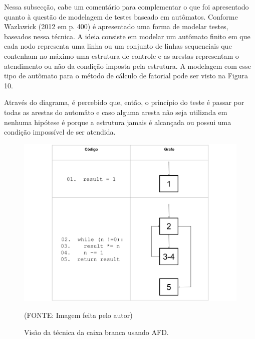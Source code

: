 \documentclass[
    12pt,       %
    openright,      %
    twoside,      %
    a4paper,      %
    english,      %
    french,       %
    spanish,      %
    brazil,       %
    ]{abntex2}
\begin{document}
              Nessa subsecção, cabe um comentário para complementar o que foi apresentado quanto à
              questão de modelagem de testes baseado em autômatos. Conforme Wazlawick (2012 em p. 400) é
              apresentado uma forma de modelar testes, baseados nessa técnica. A ideia consiste em
              modelar um autômato finito em que cada nodo representa uma linha ou um conjunto de
              linhas sequenciais que contenham no máximo uma estrutura de controle e as arestas
              representam o atendimento ou não da condição imposta pela estrutura. A modelagem
              com esse tipo de autômato para o método de cálculo de fatorial pode ser visto na Figura 10.

              Através do diagrama, é percebido que, então, o princípio do teste é passar por todas as
              arestas do automâto e caso alguma aresta não seja utilizada em nenhuma hipótese é porque a
              estrutura jamais é alcançada ou possui uma condição impossível de ser atendida.

              \begin{figure}[htbp]
                  \begin{center}
                      \includegraphics[width=1.0\textwidth]{img/whitebox.png}
                  \end{center}
              \caption{\label{fig:passaro}Visão da técnica da caixa branca usando AFD.}
              \begin{center}(FONTE: Imagem feita pelo autor)\end{center}
              \end{figure}
\end{document}
